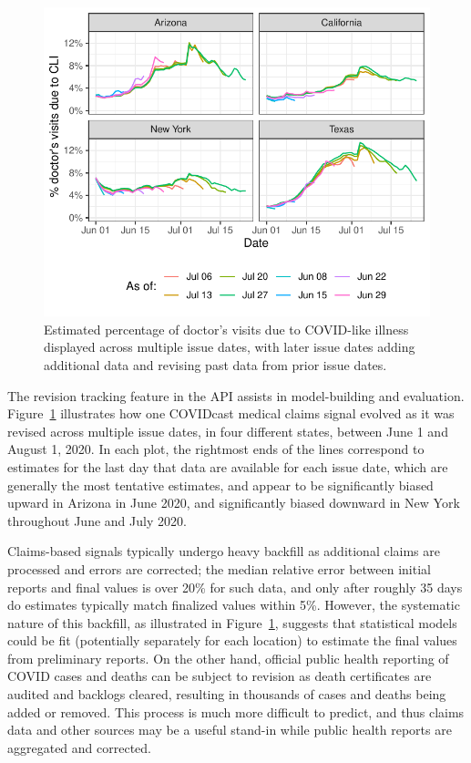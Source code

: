 \documentclass[9pt,twocolumn,twoside,lineno]{pnas-new}
\begin{document}
\begin{figure}[t]
\centering
\includegraphics[width=\columnwidth]{fig/dv_as_of.pdf}
\caption{Estimated percentage of doctor's visits due to COVID-like illness
  displayed across multiple issue dates, with later issue dates adding
  additional data and revising past data from prior issue dates.}
\label{fig:dv_as_of}
\end{figure}

The revision tracking feature in the API assists in model-building and
evaluation. Figure~\ref{fig:dv_as_of} illustrates how one COVIDcast medical
claims signal evolved as it was revised across multiple issue dates, in four
different states, between June 1 and August 1, 2020. In each plot, the rightmost
ends of the lines correspond to estimates for the last day that data are
available for each issue date, which are generally the most tentative estimates,
and appear to be significantly biased upward in Arizona in June 2020, and
significantly biased downward in New York throughout June and July 2020.

Claims-based signals typically undergo heavy backfill as additional claims are
processed and errors are corrected; the median relative error between initial
reports and final values is over 20\% for such data, and only after roughly 35
days do estimates typically match finalized values within 5\%. However, the
systematic nature of this backfill, as illustrated in Figure~\ref{fig:dv_as_of},
suggests that statistical models could be fit (potentially separately for each
location) to estimate the final values from preliminary reports. On the other
hand, official public health reporting of COVID cases and deaths can be subject
to revision as death certificates are audited and backlogs cleared, resulting in
thousands of cases and deaths being added or removed. This process is much more
difficult to predict, and thus claims data and other sources may be a useful
stand-in while public health reports are aggregated and corrected.
\end{document}
